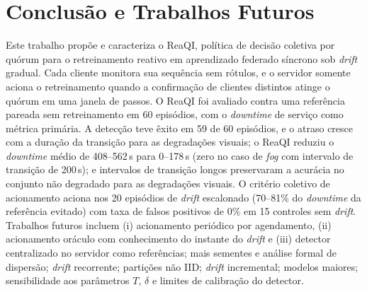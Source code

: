 \documentclass[conference]{IEEEtran}
\begin{document}
\section{Conclusão e Trabalhos Futuros}
Este trabalho propõe e caracteriza o ReaQI, política de decisão coletiva por quórum para o retreinamento reativo em aprendizado federado síncrono sob \textit{drift} gradual. Cada cliente monitora sua sequência sem rótulos, e o servidor somente aciona o retreinamento quando a confirmação de clientes distintos atinge o quórum em uma janela de passos. O ReaQI foi avaliado contra uma referência pareada sem retreinamento em 60 episódios, com o \textit{downtime} de serviço como métrica primária. A detecção teve êxito em 59 de 60 episódios, e o atraso cresce com a duração da transição para as degradações visuais; o ReaQI reduziu o \textit{downtime} médio de 408--562\,s para 0--178\,s (zero no caso de \textit{fog} com intervalo de transição de 200\,s); e intervalos de transição longos preservaram a acurácia no conjunto não degradado para as degradações visuais. O critério coletivo de acionamento aciona nos 20 episódios de \textit{drift} escalonado (70--81\% do \textit{downtime} da referência evitado) com taxa de falsos positivos de 0\% em 15 controles sem \textit{drift}. Trabalhos futuros incluem (i) acionamento periódico por agendamento, (ii) acionamento oráculo com conhecimento do instante do \textit{drift} e (iii) detector centralizado no servidor como referências; mais sementes e análise formal de dispersão; \textit{drift} recorrente; partições não IID; \textit{drift} incremental; modelos maiores; sensibilidade aos parâmetros $T$, $\delta$ e limites de calibração do detector.
\end{document}
